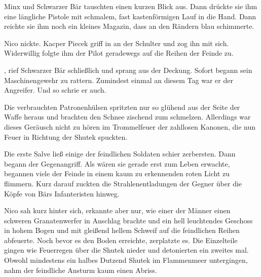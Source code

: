 Minx und Schwarzer Bär tauschten einen kurzen Blick aus. Dann drückte sie ihm eine längliche Pistole mit schmalem, fast kastenförmigen Lauf in die Hand.  Dann reichte sie ihm noch ein kleines Magazin, dass an den Rändern blau schimmerte. 

\par

Nico nickte. Kacper Piecek griff in an der Schulter und zog ihn mit sich. Widerwillig folgte ihm der Pilot geradewegs auf die Reihen der Feinde zu.

\par

, rief Schwarzer Bär schließlich und sprang aus der Deckung. Sofort begann sein Maschinengewehr zu rattern. Zumindest einmal an diesem Tag war er der Angreifer. Und so schrie er auch.

\par

Die verbrauchten Patronenhülsen spritzten nur so glühend aus der Seite der Waffe heraus und brachten den Schnee zischend zum schmelzen. Allerdings war dieses Geräusch nicht zu hören im Trommelfeuer der zahllosen Kanonen, die nun Feuer in Richtung der Shutek spuckten.

\par

Die erste Salve ließ einige der feindlichen Soldaten schier zerbersten. Dann begann der Gegenangriff. Als wären sie gerade erst zum Leben erwachte, begannen viele der Feinde in einem kaum zu erkennenden roten Licht zu flimmern. Kurz darauf zuckten die Strahlenentladungen der Gegner über die Köpfe von Bärs Infanteristen hinweg.

\par

Nico sah kurz hinter sich, erkannte aber nur, wie einer der Männer einen schweren Granatenwerfer in Anschlag brachte und ein hell leuchtendes Geschoss in hohem Bogen und mit gleißend hellem Schweif auf die feindlichen Reihen abfeuerte. Noch bevor es den Boden erreichte, zerplatzte es. Die Einzelteile gingen wie Feuerregen über die Shutek nieder und detonierten ein zweites mal. Obwohl mindestens ein halbes Dutzend Shutek im Flammenmeer untergingen, nahm der feindliche Ansturm kaum einen Abriss.

\par

